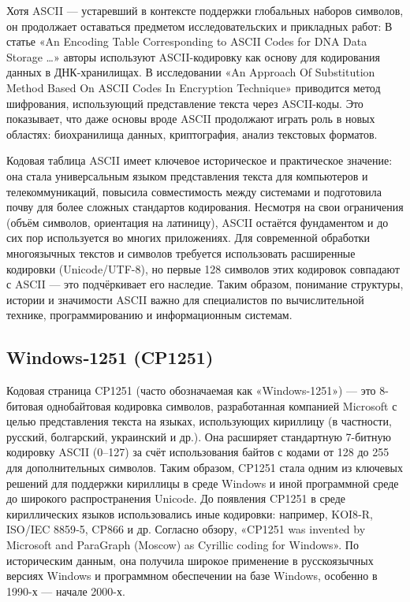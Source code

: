 \documentclass{ou}
\begin{document}
Хотя ASCII — устаревший в контексте поддержки глобальных наборов символов, он продолжает оставаться предметом исследовательских и прикладных работ: В статье «An Encoding Table Corresponding to ASCII Codes for DNA Data Storage …» авторы используют ASCII-кодировку как основу для кодирования данных в ДНК-хранилищах. В исследовании «An Approach Of Substitution Method Based On ASCII Codes In Encryption Technique» приводится метод шифрования, использующий представление текста через ASCII-коды. Это показывает, что даже основы вроде ASCII продолжают играть роль в новых областях: биохранилища данных, криптография, анализ текстовых форматов.

Кодовая таблица ASCII имеет ключевое историческое и практическое значение: она стала универсальным языком представления текста для компьютеров и телекоммуникаций, повысила совместимость между системами и подготовила почву для более сложных стандартов кодирования. Несмотря на свои ограничения (объём символов, ориентация на латиницу), ASCII остаётся фундаментом и до сих пор используется во многих приложениях. Для современной обработки многоязычных текстов и символов требуется использовать расширенные кодировки (Unicode/UTF-8), но первые 128 символов этих кодировок совпадают с ASCII — это подчёркивает его наследие. Таким образом, понимание структуры, истории и значимости ASCII важно для специалистов по вычислительной технике, программированию и информационным системам.
\newpage
\subsection{Windows‑1251 (CP1251)}
Кодовая страница CP1251 (часто обозначаемая как «Windows-1251») — это 8-битовая однобайтовая кодировка символов, разработанная компанией Microsoft с целью представления текста на языках, использующих кириллицу (в частности, русский, болгарский, украинский и др.). Она расширяет стандартную 7-битную кодировку ASCII (0--127) за счёт использования байтов с кодами от 128 до 255 для дополнительных символов. Таким образом, CP1251 стала одним из ключевых решений для поддержки кириллицы в среде Windows и иной программной среде до широкого распространения Unicode. До появления CP1251 в среде кириллических языков использовались иные кодировки: например, KOI8‑R, ISO/IEC 8859‑5, CP866 и др. Согласно обзору, «CP1251 was invented by Microsoft and ParaGraph (Moscow) as Cyrillic coding for Windows». По историческим данным, она получила широкое применение в русскоязычных версиях Windows и программном обеспечении на базе Windows, особенно в 1990-х — начале 2000-х.
\end{document}
